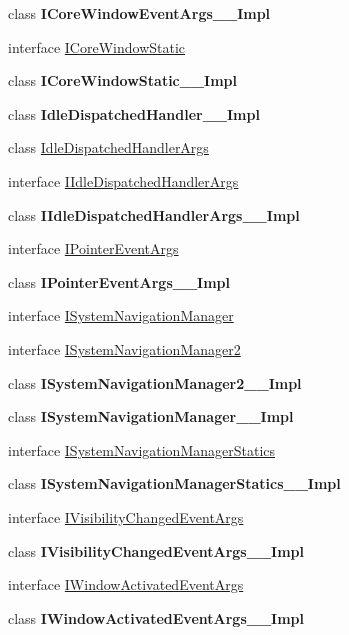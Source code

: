 \begin{DoxyCompactItemize}
\item 
class {\bfseries I\+Core\+Window\+Event\+Args\+\_\+\+\_\+\+Impl}
\item 
interface \hyperlink{interface_windows_1_1_u_i_1_1_core_1_1_i_core_window_static}{I\+Core\+Window\+Static}
\item 
class {\bfseries I\+Core\+Window\+Static\+\_\+\+\_\+\+Impl}
\item 
class {\bfseries Idle\+Dispatched\+Handler\+\_\+\+\_\+\+Impl}
\item 
class \hyperlink{class_windows_1_1_u_i_1_1_core_1_1_idle_dispatched_handler_args}{Idle\+Dispatched\+Handler\+Args}
\item 
interface \hyperlink{interface_windows_1_1_u_i_1_1_core_1_1_i_idle_dispatched_handler_args}{I\+Idle\+Dispatched\+Handler\+Args}
\item 
class {\bfseries I\+Idle\+Dispatched\+Handler\+Args\+\_\+\+\_\+\+Impl}
\item 
interface \hyperlink{interface_windows_1_1_u_i_1_1_core_1_1_i_pointer_event_args}{I\+Pointer\+Event\+Args}
\item 
class {\bfseries I\+Pointer\+Event\+Args\+\_\+\+\_\+\+Impl}
\item 
interface \hyperlink{interface_windows_1_1_u_i_1_1_core_1_1_i_system_navigation_manager}{I\+System\+Navigation\+Manager}
\item 
interface \hyperlink{interface_windows_1_1_u_i_1_1_core_1_1_i_system_navigation_manager2}{I\+System\+Navigation\+Manager2}
\item 
class {\bfseries I\+System\+Navigation\+Manager2\+\_\+\+\_\+\+Impl}
\item 
class {\bfseries I\+System\+Navigation\+Manager\+\_\+\+\_\+\+Impl}
\item 
interface \hyperlink{interface_windows_1_1_u_i_1_1_core_1_1_i_system_navigation_manager_statics}{I\+System\+Navigation\+Manager\+Statics}
\item 
class {\bfseries I\+System\+Navigation\+Manager\+Statics\+\_\+\+\_\+\+Impl}
\item 
interface \hyperlink{interface_windows_1_1_u_i_1_1_core_1_1_i_visibility_changed_event_args}{I\+Visibility\+Changed\+Event\+Args}
\item 
class {\bfseries I\+Visibility\+Changed\+Event\+Args\+\_\+\+\_\+\+Impl}
\item 
interface \hyperlink{interface_windows_1_1_u_i_1_1_core_1_1_i_window_activated_event_args}{I\+Window\+Activated\+Event\+Args}
\item 
class {\bfseries I\+Window\+Activated\+Event\+Args\+\_\+\+\_\+\+Impl}

\end{DoxyCompactItemize}
